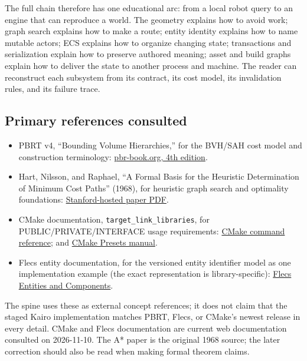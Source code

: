 The full chain therefore has one educational arc: from a local robot query to an engine that can reproduce a world. The geometry explains how to avoid work; graph search explains how to make a route; entity identity explains how to name mutable actors; ECS explains how to organize changing state; transactions and serialization explain how to preserve authored meaning; asset and build graphs explain how to deliver the state to another process and machine. The reader can reconstruct each subsystem from its contract, its cost model, its invalidation rules, and its failure trace.

\subsection{Primary references consulted}\label{05-engine-i-ch008-primary-references-consulted}

\begin{itemize}
\tightlist
\item
  PBRT v4, ``Bounding Volume Hierarchies,'' for the BVH/SAH cost model and construction terminology: \href{https://www.pbr-book.org/4ed/Primitives_and_Intersection_Acceleration/Bounding_Volume_Hierarchies}{pbr-book.org, 4th edition}.
\item
  Hart, Nilsson, and Raphael, ``A Formal Basis for the Heuristic Determination of Minimum Cost Paths'' (1968), for heuristic graph search and optimality foundations: \href{https://ai.stanford.edu/~nilsson/OnlinePubs-Nils/PublishedPapers/astar.pdf}{Stanford-hosted paper PDF}.
\item
  CMake documentation, \texttt{target\_link\_libraries}, for PUBLIC/PRIVATE/INTERFACE usage requirements: \href{https://cmake.org/cmake/help/latest/command/target_link_libraries.html}{CMake command reference}; and \href{https://cmake.org/cmake/help/latest/manual/cmake-presets.7.html}{CMake Presets manual}.
\item
  Flecs entity documentation, for the versioned entity identifier model as one implementation example (the exact representation is library-specific): \href{https://www.flecs.dev/flecs/EntitiesComponents.html}{Flecs Entities and Components}.
\end{itemize}

The spine uses these as external concept references; it does not claim that the staged Kairo implementation matches PBRT, Flecs, or CMake's newest release in every detail. CMake and Flecs documentation are current web documentation consulted on 2026-11-10. The A* paper is the original 1968 source; the later correction should also be read when making formal theorem claims.

